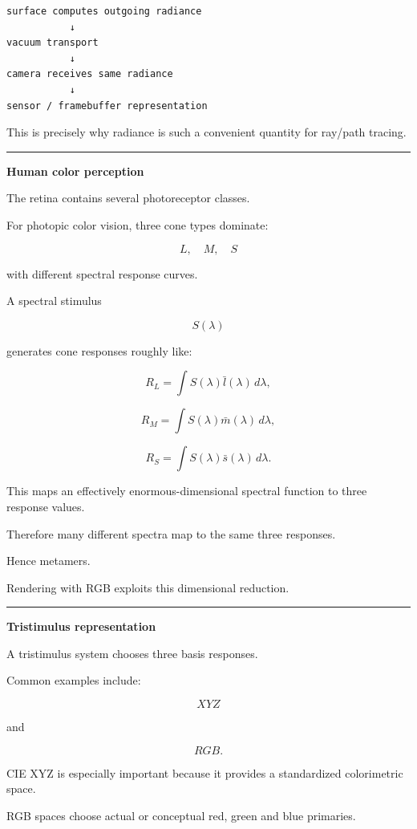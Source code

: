 \begin{verbatim}
surface computes outgoing radiance
           ↓
vacuum transport
           ↓
camera receives same radiance
           ↓
sensor / framebuffer representation
\end{verbatim}

This is precisely why radiance is such a convenient quantity for ray/path tracing.

\begin{center}\rule{0.5\linewidth}{0.5pt}\end{center}

\textbf{Human color perception}

The retina contains several photoreceptor classes.

For photopic color vision, three cone types dominate:

\[
L,\quad M,\quad S
\]

with different spectral response curves.

A spectral stimulus

\[
S(\lambda)
\]

generates cone responses roughly like:

\[
R_L=
\int S(\lambda)\bar l(\lambda)\,d\lambda,
\]

\[
R_M=
\int S(\lambda)\bar m(\lambda)\,d\lambda,
\]

\[
R_S=
\int S(\lambda)\bar s(\lambda)\,d\lambda.
\]

This maps an effectively enormous-dimensional spectral function to three response values.

Therefore many different spectra map to the same three responses.

Hence metamers.

Rendering with RGB exploits this dimensional reduction.

\begin{center}\rule{0.5\linewidth}{0.5pt}\end{center}

\textbf{Tristimulus representation}

A tristimulus system chooses three basis responses.

Common examples include:

\[
XYZ
\]

and

\[
RGB.
\]

CIE XYZ is especially important because it provides a standardized colorimetric space.

RGB spaces choose actual or conceptual red, green and blue primaries.

